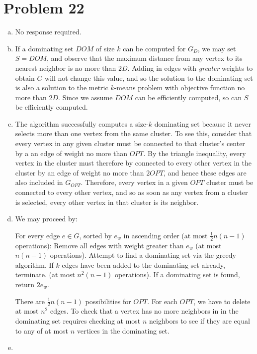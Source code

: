 \documentclass{article}[12pt]
\begin{document}
\section{Problem 22}
\begin{enumerate}[(a)]

\item No response required. 

\item If a dominating set $DOM$ of size $k$ can be computed for $G_D$, we may set $S=DOM$, and observe that the maximum distance from any vertex to its nearest neighbor is no more than $2D$. Adding in edges with {\em greater} weights to obtain $G$ will not change this value, and so the solution to the dominating set is also a solution to the metric $k$-means problem with objective function no more than $2D$. Since we assume $DOM$ can be efficiently computed, so can $S$ be efficiently computed. 

\item The algorithm successfully computes a size-$k$ dominating set because it never selects more than one vertex from the same cluster. To see this, consider that every vertex in any given cluster must be connected to that cluster's center by a an edge of weight no more than $OPT$. By the triangle inequality, every vertex in the cluster must therefore by connected to every other vertex in the cluster by an edge of weight no more than $2OPT$, and hence these edges are also included in $G_{OPT}$. Therefore, every vertex in a given $OPT$ cluster must be connected to every other vertex, and so as soon as any vertex from a cluster is selected, every other vertex in that cluster is its neighbor. 

\item We may proceed by:
\begin{outline}[enumerate]
\1 For every edge $e \in G$, sorted by $e_w$ in ascending order (at most $\frac{1}{2}n(n-1)$ operations):
\2 Remove all edges with weight greater than $e_w$ (at most $n(n-1)$ operations). 
\2 Attempt to find a dominating set via the greedy algorithm. If $k$ edges have been added to the dominating set already, terminate. (at most $n^2(n-1)$ operations). 
\2 If a dominating set is found, return $2e_w$. 
\end{outline}
There are $\frac{1}{2}n(n-1)$ possibilities for $OPT$. For each $OPT$, we have to delete at most $n^2$ edges. To check that a vertex has no more neighbors in in the dominating set requires checking at most $n$ neighbors to see if they are equal to any of at most $n$ vertices in the dominating set. 

\item

\end{enumerate}
\end{document}
